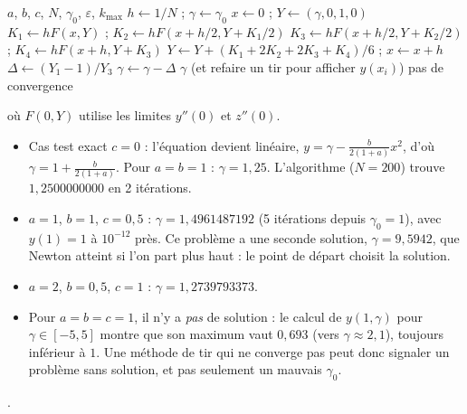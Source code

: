 \begin{algo}
  \Require $a$, $b$, $c$, $N$, $\gamma_0$, $\varepsilon$, $k_{\max}$
  \State $h \leftarrow 1/N$ ; $\gamma \leftarrow \gamma_0$
    \State $x \leftarrow 0$ ; $Y \leftarrow (\gamma, 0, 1, 0)$ 
      \State $K_1 \leftarrow hF(x, Y)$ ; $K_2 \leftarrow hF(x + h/2, Y + K_1/2)$
      \State $K_3 \leftarrow hF(x + h/2, Y + K_2/2)$ ; $K_4 \leftarrow hF(x + h, Y + K_3)$
      \State $Y \leftarrow Y + (K_1 + 2K_2 + 2K_3 + K_4)/6$ ; $x \leftarrow x + h$
    \EndFor
    \State $\Delta \leftarrow (Y_1 - 1)/Y_3$ 
    \State $\gamma \leftarrow \gamma - \Delta$
    \If{$\abs{\Delta} < \varepsilon$} \Print $\gamma$ (et refaire un tir pour afficher $y(x_i)$) \Stop \EndIf
  \EndFor
  \Print \og pas de convergence \fg{}
\end{algo}
où $F(0, Y)$ utilise les limites $y''(0)$ et $z''(0)$.

\Verif
\begin{itemize}
  \item Cas test exact $c = 0$ : l'équation devient linéaire,
        $y = \gamma - \frac{b}{2(1+a)}x^2$, d'où $\gamma = 1 + \frac{b}{2(1+a)}$.
        Pour $a = b = 1$ : $\gamma = 1{,}25$. L'algorithme ($N = 200$) trouve
        $1{,}2500000000$ en 2 itérations.
  \item $a = 1$, $b = 1$, $c = 0{,}5$ : $\gamma = 1{,}4961487192$ (5 itérations
        depuis $\gamma_0 = 1$), avec $y(1) = 1$ à $10^{-12}$ près. Ce problème a
        une seconde solution, $\gamma = 9{,}5942$, que Newton atteint si l'on part
        plus haut : le point de départ choisit la solution.
  \item $a = 2$, $b = 0{,}5$, $c = 1$ : $\gamma = 1{,}2739793373$.
  \item Pour $a = b = c = 1$, il n'y a \emph{pas} de solution : le calcul de
        $y(1, \gamma)$ pour $\gamma \in [-5, 5]$ montre que son maximum vaut
        $0{,}693$ (vers $\gamma \approx 2{,}1$), toujours inférieur à $1$.
        Une méthode de tir qui ne converge pas peut donc signaler un problème
        sans solution, et pas seulement un mauvais $\gamma_0$.
\end{itemize}

\Refs {}.

